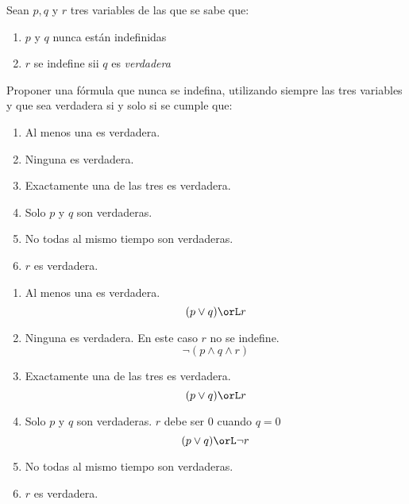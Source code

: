   \begin{enunciado}{\ejercicio}
    Sean $p, q$ y $r$ tres variables de las que se sabe que:
    \begin{enumerate}[label=\tiny$\blacksquare$]
      \item $p$ y $q$ nunca están indefinidas
      \item $r$ se indefine sii $q$ es \textit{verdadera}
    \end{enumerate}
    Proponer una fórmula que nunca se indefina, utilizando siempre las tres variables y que sea verdadera si y solo si se cumple que:
    \begin{multicols}{2}
      \begin{enumerate}[label=\alph*)]
        \item Al menos una es verdadera.
        \item Ninguna es verdadera.
        \item Exactamente una de las tres es verdadera.
        \item Solo $p$ y $q$ son verdaderas.
        \item No todas al mismo tiempo son verdaderas.
        \item $r$ es verdadera.
      \end{enumerate}
    \end{multicols}
  \end{enunciado}

  \begin{enumerate}[label=\alph*)]
    \item Al menos una es verdadera.
          $$
            (p \lor q) \orL r
          $$

    \item Ninguna es verdadera. En este caso $r$ no se indefine.
          $$
            \neg(p \land q \land r)
          $$


    \item Exactamente una de las tres es verdadera.
          $$
            (p \lor q) \orL r
          $$

    \item Solo $p$ y $q$ son verdaderas. $r$ debe ser 0 cuando $q = 0$
          $$
            (p \lor q) \orL \neg r
          $$

    \item No todas al mismo tiempo son verdaderas.

    \item $r$ es verdadera.

  \end{enumerate}
